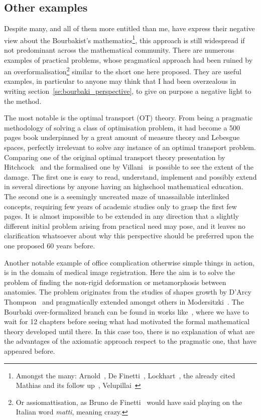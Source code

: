 \documentclass[]{scrartcl}
\begin{document}
\subsection*{Other examples}

Despite many, and all of them more entitled than me, have express their negative view about the Bourbakist's mathematics\footnote{
    Amongst the many: Arnold~\cite{arnol1998teaching}, De Finetti~\cite{de2008bruno}, Lockhart~\cite{lockhart2009mathematician}, the already cited Mathias and its follow up~\cite{mathias1998further}, Velupillai~\cite{velupillai2012bourbaki}
}, this approach is still widespread if not predominant across the mathematical community. 
There are numerous examples of practical problems, whose pragmatical approach had been ruined by an overformalisation\footnote{
    Or assiomattisation, as Bruno de Finetti~\cite{de2008bruno} would have said playing on the Italian word \emph{matti}, meaning crazy.
} similar to the short one here proposed. They are useful examples, in particular to anyone may think that I had been overzealous in writing section~\ref{se:bourbaki_perspective}, to give on purpose a negative light to the method.

The most notable is the optimal transport (OT) theory. From being a pragmatic methodology of solving a class of optimisation problem, it had become a 500 pages book underpinned by a great amount of measure theory and Lebesgue spaces, perfectly irrelevant to solve any instance of an optimal transport problem. Comparing one of the original optimal transport theory presentation by Hitchcock~\cite{hitchcock1941distribution} and the formalised one by Villani~\cite{villani2003topics} is possible to see the extent of the damage. The first one is easy to read, understand, implement and possibly extend in several directions by anyone having an highschool mathematical education. The second one is a seemingly uncreated maze of unassailable interlinked concepts, requiring few years of academic studies only to grasp the first few pages. It is almost impossible to be extended in any direction that a slightly different initial problem arising from practical need may pose, and it leaves no clarification whatsoever about why this perspective should be preferred upon the one proposed 60 years before. %

Another notable example of office complication otherwise simple things in action, is in the domain of medical image registration. Here the aim is to solve the problem of finding the non-rigid deformation or metamorphosis between anatomies. The problem originates from the studies of shapes growth by D'Arcy Thompson~\cite{d1942growth} and pragmatically extended amongst others in Modersitzki~\cite{modersitzki2004numerical}. The Bourbaki over-formalized branch can be found in works like~\cite{younes2010shapes}, where we have to wait for 12 chapters before seeing what had motivated the formal mathematical theory developed until there. 
In this case too, there is no explanation of what are the advantages of the axiomatic approach respect to the pragmatic one, that have appeared before.
\end{document}
